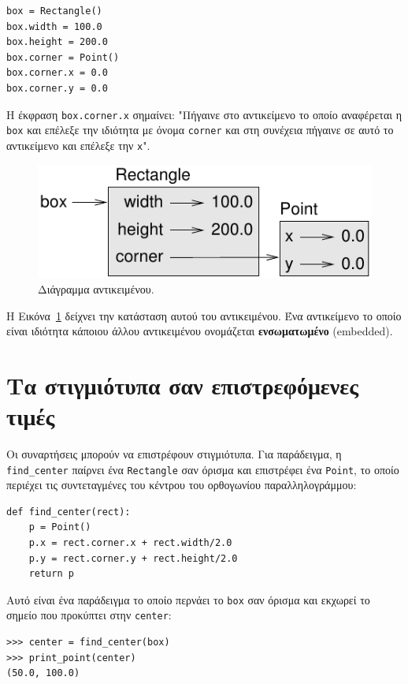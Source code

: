 \documentclass[10pt]{book}
\begin{document}
\begin{verbatim}
box = Rectangle()
box.width = 100.0
box.height = 200.0
box.corner = Point()
box.corner.x = 0.0
box.corner.y = 0.0
\end{verbatim}
%
Η έκφραση {\tt box.corner.x} σημαίνει: "Πήγαινε στο αντικείμενο το οποίο αναφέρεται η {\tt box} και επέλεξε την
ιδιότητα με όνομα {\tt corner} και στη συνέχεια πήγαινε σε αυτό το αντικείμενο και επέλεξε την {\tt x}".

\begin{figure}
\centerline
{\includegraphics[scale=0.8]{figs/rectangle.pdf}}
 \caption{Διάγραμμα αντικειμένου.} 
\label{fig.rectangle}
\end{figure}


Η Εικόνα~\ref{fig.rectangle} δείχνει την κατάσταση αυτού του αντικειμένου.
Ένα αντικείμενο το οποίο είναι ιδιότητα κάποιου άλλου αντικειμένου ονομάζεται {\bf ενσωματωμένο} (embedded).


\section{Τα στιγμιότυπα σαν επιστρεφόμενες τιμές}

Οι συναρτήσεις μπορούν να επιστρέφουν στιγμιότυπα. Για παράδειγμα, η \verb"find_center" παίρνει ένα {\tt Rectangle}
σαν όρισμα και επιστρέφει ένα {\tt Point}, το οποίο περιέχει τις συντεταγμένες του κέντρου του ορθογωνίου
παραλληλογράμμου:

\begin{verbatim}
def find_center(rect):
    p = Point()
    p.x = rect.corner.x + rect.width/2.0
    p.y = rect.corner.y + rect.height/2.0
    return p
\end{verbatim}
%
Αυτό είναι ένα παράδειγμα το οποίο περνάει το {\tt box} σαν όρισμα και εκχωρεί το σημείο που προκύπτει στην
{\tt center}:

\begin{verbatim}
>>> center = find_center(box)
>>> print_point(center)
(50.0, 100.0)
\end{verbatim}
%
\end{document}
